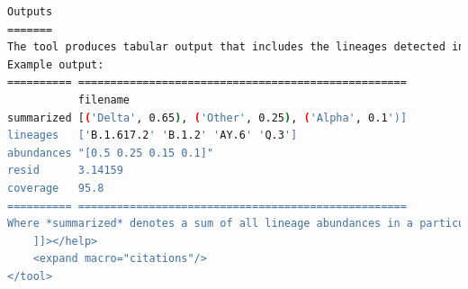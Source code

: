 \begin{lstlisting}[language=bash, caption=tool wrapper for Freyja: Demix lineage abundances, label=list:methods:wrapper-freyja-demix]
Outputs
=======
The tool produces tabular output that includes the lineages detected in the sample, their corresponding abundances, and a lineage summary by constellation.
Example output:
========== ===================================================
           filename
summarized [('Delta', 0.65), ('Other', 0.25), ('Alpha', 0.1')] 
lineages   ['B.1.617.2' 'B.1.2' 'AY.6' 'Q.3']
abundances "[0.5 0.25 0.15 0.1]"
resid      3.14159
coverage   95.8
========== ===================================================
Where *summarized* denotes a sum of all lineage abundances in a particular WHO designation (i.e. B.1.617.2 and AY.6 abundances are summed in the above example), otherwise they are grouped into "Other". The *lineage* array lists the identified lineages in descending order, and *abundances* contains the corresponding abundances estimates. The value of *resid* corresponds to the residual of the weighted least absolute devation problem used to estimate lineage abundances. The *coverage* value provides the 10x coverage estimate (percent of sites with 10 or greater reads- 10 is the default but can be modfied using the *--covcut* option).
    ]]></help>
    <expand macro="citations"/>
</tool>
\end{lstlisting}
